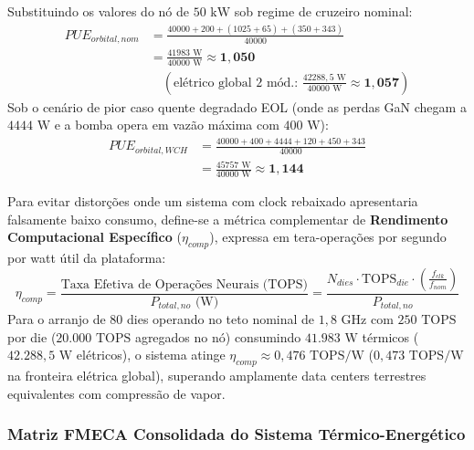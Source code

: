 Substituindo os valores do nó de $50\text{ kW}$ sob regime de cruzeiro nominal:
\begin{align}
    PUE_{orbital,nom} &= \frac{40000 + 200 + (1025 + 65) + (350 + 343)}{40000} \nonumber \\
    &= \frac{41983\text{ W}}{40000\text{ W}} \approx \mathbf{1{,}050}  \nonumber \\
    &\quad \left(\text{elétrico global 2 mód.: } \frac{42288{,}5\text{ W}}{40000\text{ W}} \approx \mathbf{1{,}057}\right)
    \label{eq:pue_orbital_nom_calc}
\end{align}
Sob o cenário de pior caso quente degradado EOL (onde as perdas GaN chegam a $4444\text{ W}$ e a bomba opera em vazão máxima com $400\text{ W}$):
\begin{align}
    PUE_{orbital,WCH} &= \frac{40000 + 400 + 4444 + 120 + 450 + 343}{40000} \nonumber \\
    &= \frac{45757\text{ W}}{40000\text{ W}} \approx \mathbf{1{,}144} 
    \label{eq:pue_orbital_wch_calc}
\end{align}

Para evitar distorções onde um sistema com clock rebaixado apresentaria falsamente baixo consumo, define-se a métrica complementar de \textbf{Rendimento Computacional Específico} ($\eta_{comp}$), expressa em tera-operações por segundo por watt útil da plataforma:
\begin{equation}
    \eta_{comp} = \frac{\text{Taxa Efetiva de Operações Neurais (TOPS)}}{P_{total,no}\text{ (W)}} = \frac{N_{dies} \cdot \text{TOPS}_{die} \cdot \left(\frac{f_{clk}}{f_{nom}}\right)}{P_{total,no}}
    \label{eq:rendimento_computacional}
\end{equation}
Para o arranjo de 80 dies operando no teto nominal de $1{,}8\text{ GHz}$ com $250\text{ TOPS}$ por die ($20.000\text{ TOPS}$ agregados no nó) consumindo $41.983\text{ W}$ térmicos ($42.288{,}5\text{ W}$ elétricos), o sistema atinge $\eta_{comp} \approx 0{,}476\text{ TOPS/W}$ ($0{,}473\text{ TOPS/W}$ na fronteira elétrica global), superando amplamente data centers terrestres equivalentes com compressão de vapor.

\subsubsection{Matriz FMECA Consolidada do Sistema Térmico-Energético}
\label{sec:fmeca_limiares_falha}

